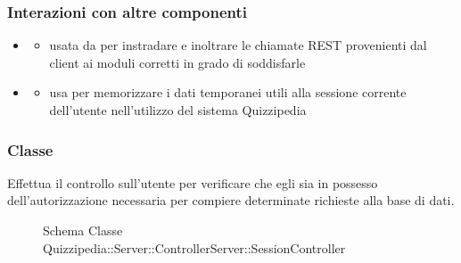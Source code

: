 \subsubsection{Interazioni con altre componenti}
\begin{itemize}
\item {}
\begin{itemize}
\item usata da  per instradare e inoltrare le chiamate REST provenienti dal client ai moduli corretti in grado di soddisfarle
\end{itemize}
\item {}
\begin{itemize}
\item usa  per memorizzare i dati temporanei utili alla sessione corrente dell'utente nell'utilizzo del sistema Quizzipedia
\end{itemize}
\end{itemize}
\subsubsection{Classe }
Effettua il controllo sull'utente per verificare che egli sia in possesso dell'autorizzazione necessaria per compiere determinate richieste alla base di dati.
\begin{figure}[H]
\centering
\noindent{}
\caption[Schema Classe SessionController]{Schema Classe Quizzipedia::Server::ControllerServer::SessionController}
\end{figure}
